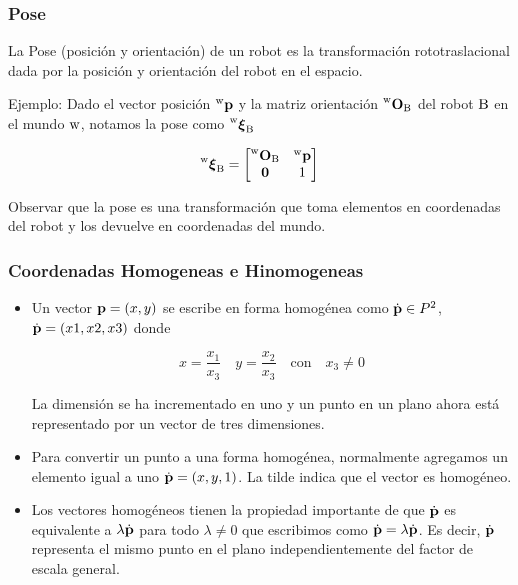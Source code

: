 \begin{frame}
    \frametitle{Pose}
    
    La Pose (posición y orientación) de un robot es la transformación rototraslacional dada por la posición y orientación del robot en el espacio.
    
    Ejemplo: Dado el vector posición $\prescript{\mathrm{\mathrm{w}}}{}{\boldsymbol{\mathbf{p}}}$ y la matriz orientación $\prescript{\mathrm{\mathrm{w}}}{}{{\boldsymbol{\mathbf{O}}}_\mathrm{\mathrm{B}}}$ del robot $\mathrm{B}$ en el mundo $\mathrm{w}$, notamos la pose como $\prescript{\mathrm{\mathrm{w}}}{}{{\boldsymbol{\mathbf{\xi}}}_\mathrm{\mathrm{B}}}$
    
    \begin{equation*}
        \prescript{\mathrm{\mathrm{w}}}{}{{\boldsymbol{\mathbf{\xi}}}_\mathrm{\mathrm{B}}}=
        \begin{bmatrix}
            \prescript{\mathrm{\mathrm{w}}}{}{{\boldsymbol{\mathbf{O}}}_\mathrm{\mathrm{B}}} & \prescript{\mathrm{\mathrm{w}}}{}{\boldsymbol{\mathbf{p}}}\\
            \boldsymbol{\mathbf{0}} & 1
        \end{bmatrix}
    \end{equation*}

    Observar que la pose es una transformación que toma elementos en coordenadas del robot y los devuelve en coordenadas del mundo.
\end{frame}


\begin{frame}
    \frametitle{Coordenadas Homogeneas e Hinomogeneas}
    
    \begin{itemize}
        \item Un vector $\boldsymbol{\mathbf{p}} = (x, y)$ se escribe en forma homogénea como $\dot{\boldsymbol{\mathbf{p}}} \in P^2$, $\dot{\boldsymbol{\mathbf{p}}} = (x1, x2, x3)$ donde
        
       \begin{equation*}
            x = \dfrac{x_1}{x_3} \quad y= \dfrac{x_2}{x_3} \quad \text{con} \quad x_3 \neq 0
       \end{equation*}
        
        La dimensión se ha incrementado en uno y un punto en un plano ahora está representado por un vector de tres dimensiones.
        \item Para convertir un punto a una forma homogénea, normalmente agregamos un elemento igual a uno $\dot{\boldsymbol{\mathbf{p}}} = (x, y, 1)$. La tilde indica que el vector es homogéneo.
        \item Los vectores homogéneos tienen la propiedad importante de que $\dot{\boldsymbol{\mathbf{p}}}$ es equivalente a $\lambda \dot{\boldsymbol{\mathbf{p}}}$ para todo $\lambda \neq 0$ que escribimos como $\dot{\boldsymbol{\mathbf{p}}} = \lambda \dot{\boldsymbol{\mathbf{p}}}$. Es decir, $\dot{\boldsymbol{\mathbf{p}}}$ representa el mismo punto en el plano independientemente del factor de escala general.
    \end{itemize}
    
\end{frame}



